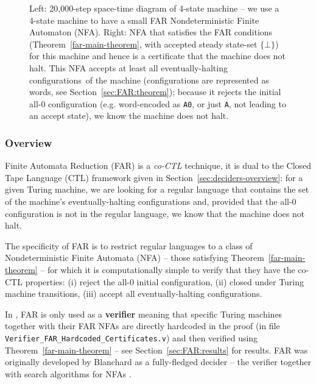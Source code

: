 \begin{figure}[h]
\begin{subfigure}[t]{0.5\textwidth}
        \label{fig:far_nfa}
    \end{subfigure}
    \caption[Short caption]{{\small Left: 20,000-step space-time diagram of 4-state machine  -- we use a 4-state machine to have a small FAR Nondeterministic Finite Automaton (NFA). Right: NFA that satisfies the FAR conditions (Theorem~\ref{far-main-theorem}, with accepted steady state-set $\{\bot\}$) for this machine and hence is a certificate that the machine does not halt. This NFA accepts at least all eventually-halting configurations\footnotemark ~of the machine (configurations are represented as words, see Section~\ref{sec:FAR:theorem}); because it rejects the initial all-0 configuration (e.g. word-encoded as \texttt{A0}, or just \texttt{A}, not leading to an accept state), we know the machine does not halt.}}
    \label{fig:finite-automata-reduction}
\end{figure}

\vspace{-1em}
\subsubsection{Overview}

\newcommand{\M}{M}
\newcommand{\T}{^{T}}

Finite Automata Reduction (FAR) is a \textit{co-CTL} technique, \ie it is dual to the Closed Tape Language (CTL) framework given in Section~\ref{sec:deciders-overview}: for a given Turing machine, we are looking for a regular language that contains the set of the machine's eventually-halting configurations and, provided that the all-0 configuration is not in the regular language, we know that the machine does not halt.

The specificity of FAR is to restrict regular languages to a class of Nondeterministic Finite Automata (NFA) -- those satisfying Theorem~\ref{far-main-theorem} -- for which it is computationally simple to verify that they have the co-CTL properties: (i) reject the all-0 initial configuration, (ii) closed under Turing machine transitions, (iii) accept all eventually-halting configurations.

In \CoqBB, FAR is only used as a \textbf{verifier} meaning that specific Turing machines together with their FAR NFAs are directly hardcoded in the proof (in file \texttt{Verifier\_FAR\_Hardcoded\_Certificates.v}) and then verified using Theorem~\ref{far-main-theorem} -- see Section~\ref{sec:FAR:results} for results. FAR was originally developed by Blanchard as a fully-fledged decider -- \ie the verifier together with search algorithms for NFAs \cite{FAR}.

